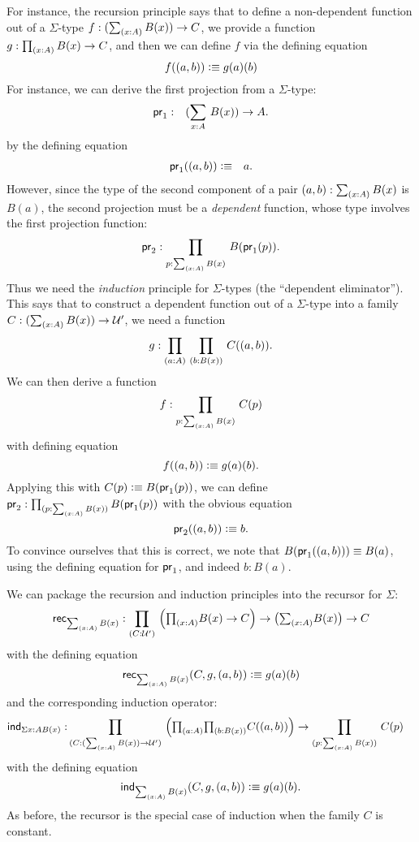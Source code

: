 For instance, the recursion principle says that to define a non-dependent function out of a $\Sigma$-type
$f : (\sm{x:A} B(x)) \to C$, we provide a function 
$g : \prd{x:A} B(x) \to C$, and then we can define $f$ via the defining
equation
\[ f((a,b)) \vcentcolon\equiv g(a)(b) \]
For instance, we can derive the first projection from a $\Sigma$-type:
\begin{eqnarray*}
  \fst & : & (\sm{x : A}B(x)) \to A.
\end{eqnarray*}
by the defining equation
\begin{eqnarray*}
  \mathsf{pr}_{1}((a,b)) & \vcentcolon\equiv & a.
\end{eqnarray*}
However, since the type of the second component of a pair $(a,b):\sm{x:A} B(x)$ is $B(a)$, the second projection must be a \emph{dependent} function, whose type involves the first projection function:
\[ \snd : \prd{p:\sm{x : A}B(x)}B(\fst(p)). \]
Thus we need the \emph{induction} principle for $\Sigma$-types (the ``dependent eliminator'').
This says that to construct a dependent function out of a $\Sigma$-type into a family $C : (\sm{x:A} B(x)) \to \UU'$, we need a function
\[ g : \prd{a:A}{b:B(x)} C(\tup{a}{b}). \]
We can then derive a function 
\[ f : \prd{p : \sm{x:A}B(x)} C(p) \]
with  defining equation
\[ f((a,b)) \vcentcolon\equiv g(a)(b).\]
Applying this with $C(p)\vcentcolon\equiv B(\mathsf{pr}_{1}(p))$, we can define $\snd : \prd{p:\sm{x : A}B(x)}B(\fst(p))$ with the obvious equation
\[ \mathsf{pr}_{2}((a,b))  \vcentcolon\equiv  b. \]
To convince ourselves that this is correct, we note that $B (\mathsf{pr}_{1}((a,b))) \equiv B(a)$, using the defining equation for $\mathsf{pr}_{1}$, and
indeed $b : B(a)$.

We can package the recursion and induction principles into the recursor for $\Sigma$:
\[ \rec{\sm{x:A}B(x)} : \dprd{C:\UU'}\Big(\tprd{x:A} B(x) \to C\Big) \to
\big(\tsm{x:A}B(x)\big) \to C \]
with the defining equation
\[ \rec{\sm{x:A}B(x)}(C,g,\tup{a}{b}) \defeq g(a)(b) \]
and the corresponding induction operator:
\begin{align*}
  \ind{\Sigma{x:A}B(x)} : & \dprd{C:(\sm{x:A} B(x)) \to \UU'}
    \Big(\tprd{a:A}{b:B(x)} C(\tup{a}{b})\Big)
    \to \dprd{p : \sm{x:A}B(x)} C(p)
\end{align*}
with the defining equation 
\[ \ind{\sm{x:A}B(x)}(C,g,\tup{a}{b}) \defeq g(a)(b). \]
As before, the recursor is the special case of induction
when the family $C$ is constant.

